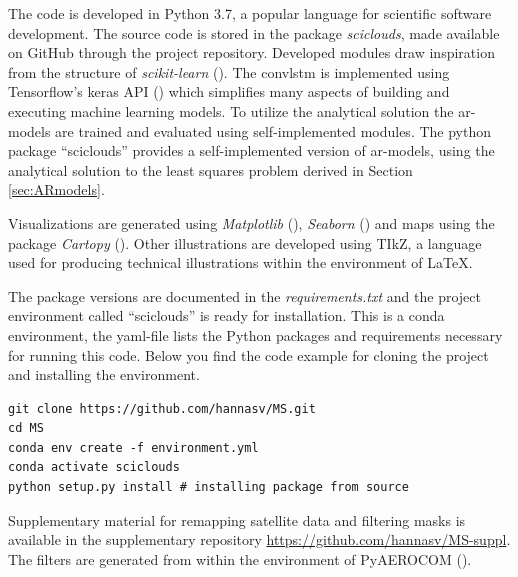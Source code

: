 The code is developed in Python 3.7, a popular language for scientific software development. The source code is stored in the package \textit{sciclouds}, made available on GitHub through the project repository. Developed modules draw inspiration from the structure of \textit{scikit-learn} (\cite{sklearn_api}).
The \acrshort{convlstm} is implemented using Tensorflow's keras API (\cite{tensorflow2015}) which simplifies many aspects of building and executing machine learning models. To utilize the analytical solution the \acrshort{ar}-models are trained and evaluated using self-implemented modules.
The python package ``sciclouds'' provides a self-implemented version of \acrshort{ar}-models, using the analytical solution to the least squares problem derived in Section \ref{sec:ARmodels}.

Visualizations are generated using \textit{Matplotlib} (\cite{matplotlib}),  \textit{Seaborn} (\cite{seaborn}) and maps using the package \textit{Cartopy} (\cite{Cartopy}). Other illustrations are developed using TIkZ, a language used for producing technical illustrations within the environment of LaTeX.

The package versions are documented in the \textit{requirements.txt} and the project environment called ``sciclouds'' is ready for installation. This is a conda environment, the yaml-file lists the Python packages and requirements necessary for running this code. Below you find the code example for cloning the project and installing the environment.

\begin{verbatim}
git clone https://github.com/hannasv/MS.git
cd MS
conda env create -f environment.yml
conda activate sciclouds
python setup.py install # installing package from source
\end{verbatim}

Supplementary material for remapping satellite data and filtering masks is available in the supplementary repository \href{https://github.com/hannasv/MS-suppl}{https://github.com/hannasv/MS-suppl}. %
The filters are generated from within the environment of PyAEROCOM (\cite{pyaerocom}). 


